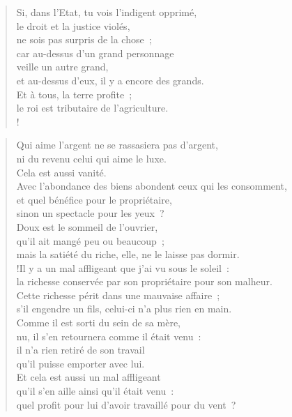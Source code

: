 \documentclass[french,twoside]{book} %
\def\mednobreak{\ifdim\lastskip<\medskipamount
  \removelastskip\nopagebreak\medskip\fi}
\newcommand{\labelblock}[1]{\medbreak{\noindent\color{rubric}\bfseries #1}\par\mednobreak}
\begin{document}
\begin{verse}
Si, dans l’Etat, tu vois l’indigent opprimé, \\
le droit et la justice violés, \\
ne sois pas surpris de la chose ; \\
car au-dessus d’un grand personnage \\
veille un autre grand, \\
et au-dessus d’eux, il y a encore des grands.\\
Et à tous, la terre profite ; \\
le roi est tributaire de l’agriculture.\\!
\end{verse}

\labelblock{La richesse et ses risques}


\begin{verse}
Qui aime l’argent ne se rassasiera pas d’argent, \\
ni du revenu celui qui aime le luxe. \\
Cela est aussi vanité.\\
Avec l’abondance des biens abondent ceux qui les consomment, \\
et quel bénéfice pour le propriétaire, \\
sinon un spectacle pour les yeux ?\\
Doux est le sommeil de l’ouvrier, \\
qu’il ait mangé peu ou beaucoup ; \\
mais la satiété du riche, elle, ne le laisse pas dormir.\\!Il y a un mal affligeant que j’ai vu sous le soleil : \\
la richesse conservée par son propriétaire pour son malheur.\\
Cette richesse périt dans une mauvaise affaire ; \\
s’il engendre un fils, celui-ci n’a plus rien en main.\\
Comme il est sorti du sein de sa mère, \\
nu, il s’en retournera comme il était venu : \\
il n’a rien retiré de son travail \\
qu’il puisse emporter avec lui.\\
Et cela est aussi un mal affligeant \\
qu’il s’en aille ainsi qu’il était venu : \\
quel profit pour lui d’avoir travaillé pour du vent ?\\

\end{verse}
\end{document}
